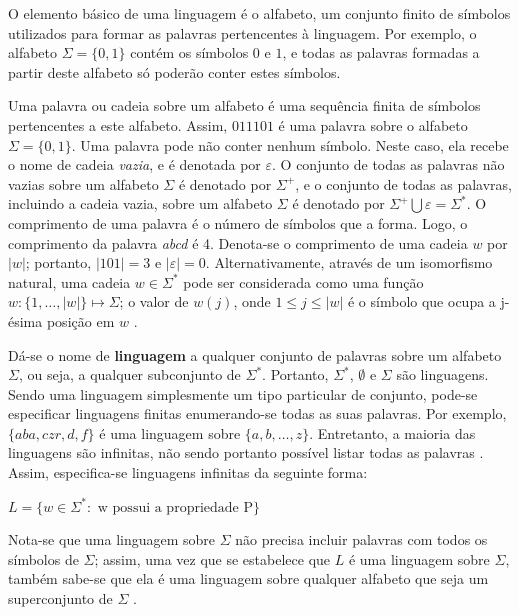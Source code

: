 \documentclass[12pt,a4paper]{article}
\begin{document}
O elemento básico de uma linguagem é o alfabeto, um conjunto finito de símbolos
utilizados para formar as palavras pertencentes à linguagem. Por exemplo, o
alfabeto $\Sigma = \{0,1\}$ contém os símbolos $0$ e $1$, e todas as palavras
formadas a partir deste alfabeto só poderão conter estes símbolos.

Uma palavra ou cadeia sobre um alfabeto é uma sequência finita de símbolos
pertencentes a este alfabeto. Assim, $011101$ é uma palavra sobre o alfabeto
$\Sigma = \{0, 1\}$. Uma palavra pode não conter nenhum símbolo. Neste caso,
ela recebe o nome de cadeia \textit{vazia}, e é denotada por $\varepsilon$.
O conjunto de todas as palavras não vazias sobre um alfabeto $\Sigma$ é
denotado por $\Sigma^+$, e o conjunto de todas as palavras, incluindo
a cadeia vazia, sobre um alfabeto $\Sigma$ é denotado por
${\Sigma}^+ \bigcup \varepsilon = \Sigma^*$. O comprimento de uma palavra
é o número de símbolos que a forma. Logo, o comprimento da palavra
\emph{abcd} é 4. Denota-se o comprimento de uma cadeia $w$ por
$|w|$; portanto, $|101| = 3$ e $|\varepsilon| = 0$. Alternativamente,
através de um isomorfismo natural, uma cadeia $w \in \Sigma^*$ pode ser
considerada como uma função $w: \{1,\ldots,|w|\} \mapsto \Sigma$; o
valor de $w(j)$, onde $1 \le j \le |w|$ é o símbolo que ocupa a j-ésima
posição em $w$ .

Dá-se o nome de \textbf{linguagem} a qualquer conjunto de palavras sobre um
alfabeto $\Sigma$, ou seja, a qualquer subconjunto de $\Sigma^*$. Portanto,
$\Sigma^*$, $\emptyset$ e $\Sigma$ são linguagens. Sendo uma linguagem 
simplesmente um tipo particular de conjunto, pode-se especificar linguagens
finitas enumerando-se todas as suas palavras. Por exemplo, $\{aba, czr, d, f\}$
é uma linguagem sobre $\{a, b, \ldots, z\}$. Entretanto, a maioria das
linguagens são infinitas, não sendo portanto possível listar todas as palavras
. Assim, especifica-se linguagens infinitas da seguinte forma:

\begin{center}
$L = \{w \in \Sigma^*: \mbox{ w possui a propriedade P}\}$
\end{center}

Nota-se que uma linguagem sobre $\Sigma$ não precisa incluir palavras com todos
os símbolos de $\Sigma$; assim, uma vez que se estabelece que $L$ é uma
linguagem sobre $\Sigma$, também sabe-se que ela é uma linguagem sobre qualquer
alfabeto que seja um superconjunto de $\Sigma$ .
\end{document}
